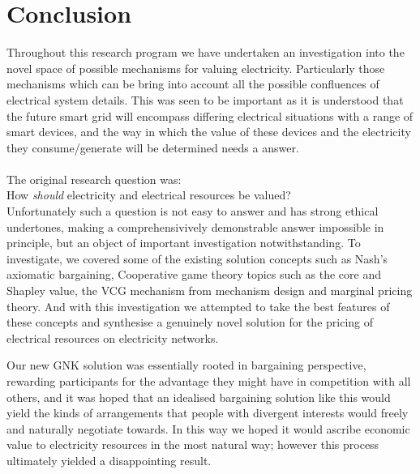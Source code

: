 \chapter{Conclusion}
\label{cha:conc}

Throughout this research program we have undertaken an investigation into the novel space of possible mechanisms for valuing electricity. Particularly those mechanisms which can be bring into account all the possible confluences of electrical system details.
This was seen to be important as it is understood that the future smart grid will encompass differing electrical situations with a range of smart devices, and the way in which the value of these devices and the electricity they consume/generate will be determined needs a answer.\\
\\\noindent
The original research question was:\\
\-\hspace{1cm}How \textit{should} electricity and electrical resources be valued?\\

Unfortunately such a question is not easy to answer and has strong ethical undertones, making a comprehensivively demonstrable answer impossible in principle, but an object of important investigation notwithstanding.
To investigate, we covered some of the existing solution concepts such as Nash's axiomatic bargaining, Cooperative game theory topics such as the core and Shapley value, the VCG mechanism from mechanism design and marginal pricing theory.
And with this investigation we attempted to take the best features of these concepts and synthesise a genuinely novel solution for the pricing of electrical resources on electricity networks.

Our new GNK solution was essentially rooted in bargaining perspective, rewarding participants for the advantage they might have in competition with all others, 
and it was hoped that an idealised bargaining solution like this would yield the kinds of arrangements that people with divergent interests would freely and naturally negotiate towards.
In this way we hoped it would ascribe economic value to electricity resources in the most natural way; however this process ultimately yielded a disappointing result.


